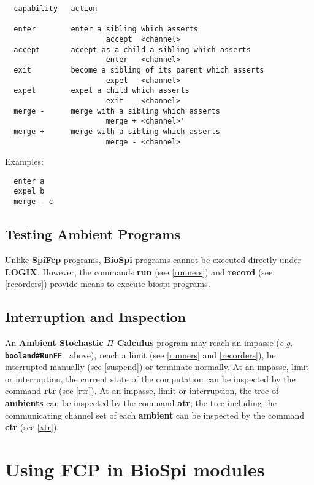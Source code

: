 \documentclass[twoside,10pt]{report}
\begin{document}
\newpage
\begin{verbatim}
  capability   action

  enter        enter a sibling which asserts
                       accept  <channel>
  accept       accept as a child a sibling which asserts
                       enter   <channel>
  exit         become a sibling of its parent which asserts
                       expel   <channel>
  expel        expel a child which asserts
                       exit    <channel>
  merge -      merge with a sibling which asserts
                       merge + <channel>'
  merge +      merge with a sibling which asserts
                       merge - <channel>
\end{verbatim}

\noindent
Examples:

\begin{verbatim}
  enter a
  expel b
  merge - c
\end{verbatim}

\section{Testing Ambient Programs}

Unlike {\bf SpiFcp} programs, {\bf BioSpi} programs cannot be
executed directly under {\bf LOGIX}.  However, the commands {\bf run} (see
\ref{runners}) and {\bf record} (see \ref{recorders})
provide means to execute biospi programs.

\section{Interruption and Inspection}

An {\bf Ambient Stochastic $\Pi$ Calculus} program may reach an impasse ({\em e.g.}
{\bf \verb+ booland#RunFF +} above), reach a limit (see \ref{runners}
and \ref{recorders}), be interrupted manually (see \ref{suspend})
or terminate normally.  At an impasse, limit or interruption,
the current state of the computation can be inspected by the command
{\bf rtr} (see \ref{rtr}).
At an impasse, limit or interruption, the tree of {\bf ambients} can be inspected
by the command {\bf atr}; the tree including the communicating channel
set of each {\bf ambient} can be inspected by the command {\bf ctr}
(see \ref{xtr}).

\chapter{Using FCP in BioSpi modules}
\label{usingFCP}
\end{document}

